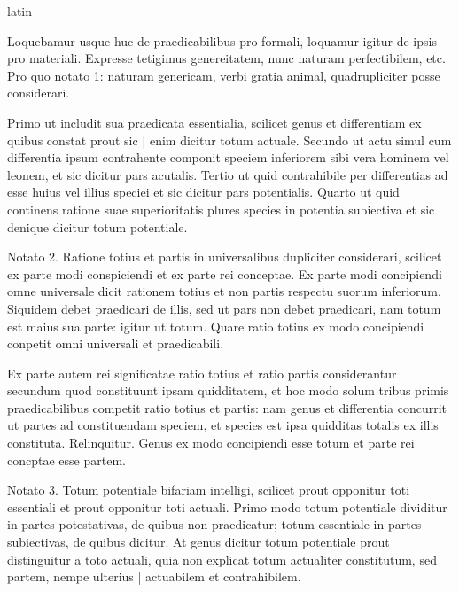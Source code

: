 \begin{otherlanguage*}{latin}
        \pstart
        \pend
      
\pstart
 Loquebamur usque huc de praedicabilibus pro formali, loquamur igitur de ipsis pro materiali. Expresse tetigimus genereitatem, nunc naturam perfectibilem, etc. Pro quo notato 1: naturam genericam, verbi gratia animal, quadrupliciter posse considerari. 
\pend

\pstart
 Primo ut includit sua praedicata essentialia, scilicet genus et differentiam ex quibus constat prout sic \textnormal{|} enim dicitur totum actuale. Secundo ut actu simul cum differentia ipsum contrahente componit speciem inferiorem sibi vera hominem vel leonem, et sic dicitur pars acutalis. Tertio ut quid contrahibile per differentias ad esse huius vel illius speciei et sic dicitur pars potentialis. Quarto ut quid continens ratione suae superioritatis plures species in potentia subiectiva et sic denique dicitur totum potentiale. 
\pend

\pstart
 Notato 2. Ratione totius et partis in universalibus dupliciter considerari, scilicet ex parte modi conspiciendi et ex parte rei conceptae. Ex parte modi concipiendi omne universale dicit rationem totius et non partis respectu suorum inferiorum. Siquidem debet praedicari de illis, sed ut pars non debet praedicari, nam totum est maius sua parte: igitur ut totum. Quare ratio totius ex modo concipiendi conpetit omni universali et praedicabili. 
\pend

\pstart
 Ex parte autem rei significatae ratio totius et ratio partis considerantur secundum quod constituunt ipsam quidditatem, et hoc modo solum tribus primis praedicabilibus competit ratio totius et partis: nam genus et differentia concurrit ut partes ad constituendam speciem, et species est ipsa quidditas totalis ex illis constituta. Relinquitur. Genus ex modo concipiendi esse totum et parte rei concptae esse partem. 
\pend

\pstart
 Notato 3. Totum potentiale bifariam intelligi, scilicet prout opponitur toti essentiali et prout opponitur toti actuali. Primo modo totum potentiale dividitur in partes potestativas, de quibus non praedicatur; totum essentiale in partes subiectivas, de quibus dicitur. At genus dicitur totum potentiale prout distinguitur a toto actuali, quia non explicat totum actualiter constitutum, sed partem, nempe ulterius \textnormal{|}   actuabilem et contrahibilem. 
\pend


\end{otherlanguage*}
